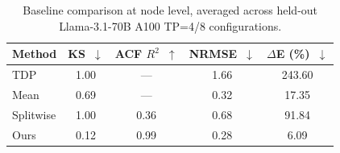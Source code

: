 \begin{table}[t]
\centering
\small
\caption{Baseline comparison at node level, averaged across held-out Llama-3.1-70B A100 TP=4/8 configurations.}
\label{tab:baselines-node}
\vspace{0.4em}
\begin{tabular}{lcccc}
\toprule
\textbf{Method} &
\textbf{KS~$\downarrow$} &
\textbf{ACF $R^2$~$\uparrow$} &
\textbf{NRMSE~$\downarrow$} &
\textbf{$\Delta$E (\%)~$\downarrow$} \\
\midrule
TDP & 1.00 & --- & 1.66 & 243.60 \\
Mean & 0.69 & --- & 0.32 & 17.35 \\
Splitwise & 1.00 & 0.36 & 0.68 & 91.84 \\
Ours & 0.12 & 0.99 & 0.28 & 6.09 \\
\bottomrule
\end{tabular}
\end{table}
